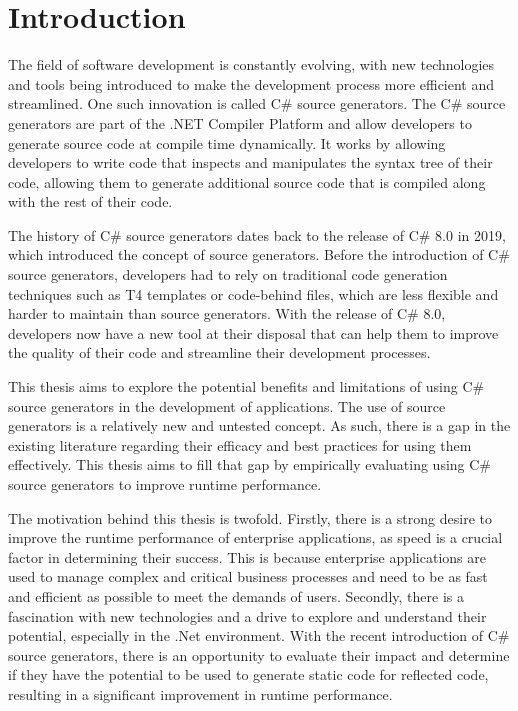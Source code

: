 \chapter{Introduction}

The field of software development is constantly evolving, with new technologies and tools being introduced to make the development process more efficient and streamlined. One such innovation is called C\# source generators. The C\# source generators are part of the .NET Compiler Platform and allow developers to generate source code at compile time dynamically. It works by allowing developers to write code that inspects and manipulates the syntax tree of their code, allowing them to generate additional source code that is compiled along with the rest of their code.

The history of C\# source generators dates back to the release of C\# 8.0 in 2019, which introduced the concept of source generators. Before the introduction of C\# source generators, developers had to rely on traditional code generation techniques such as T4 templates or code-behind files, which are less flexible and harder to maintain than source generators. With the release of C\# 8.0, developers now have a new tool at their disposal that can help them to improve the quality of their code and streamline their development processes.

This thesis aims to explore the potential benefits and limitations of using C\# source generators in the development of applications. The use of source generators is a relatively new and untested concept. As such, there is a gap in the existing literature regarding their efficacy and best practices for using them effectively. This thesis aims to fill that gap by empirically evaluating using C\# source generators to improve runtime performance.

The motivation behind this thesis is twofold. Firstly, there is a strong desire to improve the runtime performance of enterprise applications, as speed is a crucial factor in determining their success. This is because enterprise applications are used to manage complex and critical business processes and need to be as fast and efficient as possible to meet the demands of users. Secondly, there is a fascination with new technologies and a drive to explore and understand their potential, especially in the .Net environment. With the recent introduction of C\# source generators, there is an opportunity to evaluate their impact and determine if they have the potential to be used to generate static code for reflected code, resulting in a significant improvement in runtime performance.

